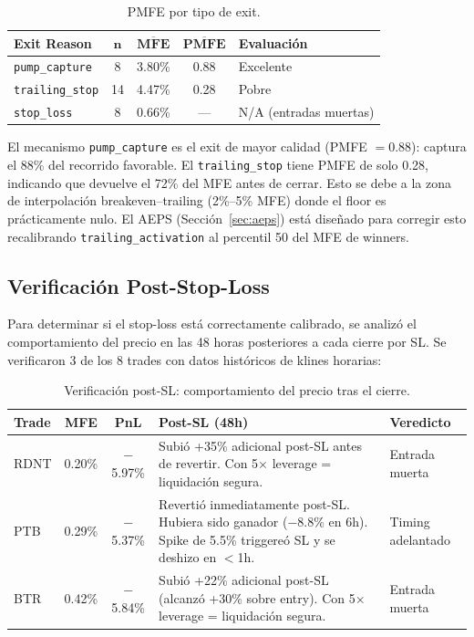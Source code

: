 \documentclass[11pt,a4paper]{article}
\newcommand{\code}[1]{\texttt{\small #1}}
\newcommand{\param}[1]{\texttt{\small\color{cpurple}#1}}
\begin{document}
\begin{table}[H]
\centering
\caption{PMFE por tipo de exit.}
\label{tab:pmfe}
\begin{tabular}{lcccl}
\toprule
\textbf{Exit Reason} & $\bm{n}$ & $\overline{\textbf{MFE}}$ & $\overline{\textbf{PMFE}}$ & \textbf{Evaluaci\'on} \\
\midrule
\code{pump\_capture} & 8 & 3.80\% & 0.88 & Excelente \\
\code{trailing\_stop} & 14 & 4.47\% & 0.28 & Pobre \\
\code{stop\_loss} & 8 & 0.66\% & --- & N/A (entradas muertas) \\
\bottomrule
\end{tabular}
\end{table}

\begin{tcolorbox}[warnbox, title=Diagn\'ostico de Salida]
El mecanismo \code{pump\_capture} es el exit de mayor calidad
(PMFE $= 0.88$): captura el 88\% del recorrido favorable.
El \code{trailing\_stop} tiene PMFE de solo 0.28, indicando
que devuelve el 72\% del MFE antes de cerrar. Esto se debe a
la zona de interpolaci\'on breakeven--trailing (2\%--5\% MFE)
donde el floor es pr\'acticamente nulo. El AEPS (Secci\'on~\ref{sec:aeps})
est\'a dise\~nado para corregir esto recalibrando \param{trailing\_activation}
al percentil 50 del MFE de winners.
\end{tcolorbox}


\subsection{Verificaci\'on Post-Stop-Loss}
\label{sec:post_sl}

Para determinar si el stop-loss est\'a correctamente calibrado, se
analiz\'o el comportamiento del precio en las 48 horas posteriores
a cada cierre por SL. Se verificaron 3 de los 8 trades con datos
hist\'oricos de klines horarias:

\begin{table}[H]
\centering
\caption{Verificaci\'on post-SL: comportamiento del precio tras el cierre.}
\label{tab:post_sl}
\begin{tabularx}{\textwidth}{lccXl}
\toprule
\textbf{Trade} & \textbf{MFE} & \textbf{PnL} & \textbf{Post-SL (48h)} & \textbf{Veredicto} \\
\midrule
RDNT & 0.20\% & $-$5.97\% & Subi\'o +35\% adicional post-SL antes de revertir.
  Con 5$\times$ leverage = liquidaci\'on segura. & \textcolor{cred}{Entrada muerta} \\
\addlinespace
PTB & 0.29\% & $-$5.37\% & Revertió inmediatamente post-SL. Hubiera sido
  ganador ($-$8.8\% en 6h). Spike de 5.5\% triggere\'o SL y se deshizo en $<$1h. & \textcolor{cgreen}{Timing adelantado} \\
\addlinespace
BTR & 0.42\% & $-$5.84\% & Subi\'o +22\% adicional post-SL (alcanz\'o +30\%
  sobre entry). Con 5$\times$ leverage = liquidaci\'on segura. & \textcolor{cred}{Entrada muerta} \\
\bottomrule
\end{tabularx}
\end{table}
\end{document}
